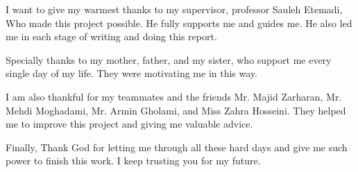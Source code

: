 
I want to give my warmest thanks to my supervisor, professor Sauleh Etemadi, Who made this project possible. He fully supports me and guides me. He also led me in each stage of writing and doing this report.  

Specially thanks to my mother, father, and my sister, who support me every single day of my life. They were motivating me in this way.

I am also thankful for my teammates and the friends Mr. Majid Zarharan, Mr. Mehdi Moghadami, Mr. Armin Gholami, and Miss Zahra Hosseini. They helped me to improve this project and giving me valuable advice. 

Finally, Thank God for letting me through all these hard days and give me such power to finish this work. I keep trusting you for my future. 